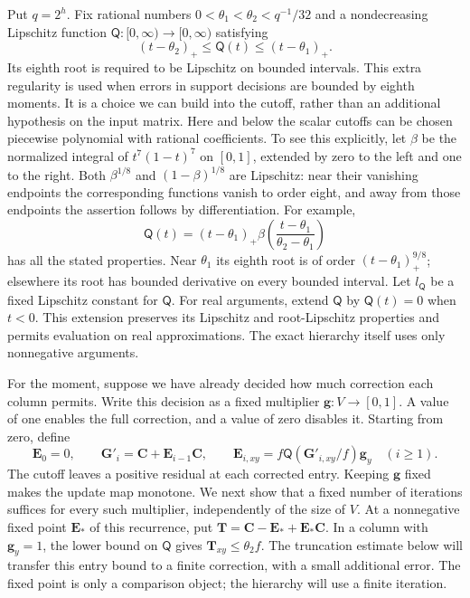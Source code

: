 \documentclass[11pt]{article}
\numberwithin{equation}{section}
\theoremstyle{definition}
\theoremstyle{remark}
\begin{document}
Put $q=2^{h}$.  Fix rational numbers
$0<\theta_1<\theta_2<q^{-1}/32$ and a nondecreasing Lipschitz function
${\mathsf{Q}}:[0,\infty)\to[0,\infty)$ satisfying
\begin{equation}
 (t-\theta_2)_+\leq {\mathsf{Q}}(t)\leq(t-\theta_1)_+.
 \label{eq:hier-Q}
\end{equation}
Its eighth root is required to be Lipschitz on bounded intervals. This extra regularity is used when errors in support decisions are bounded by eighth moments. It is a choice we can build into the cutoff, rather than an additional hypothesis on the input matrix.
Here and below the scalar cutoffs can be chosen piecewise polynomial with
rational coefficients.  To see this explicitly, let $\beta$ be the
normalized integral of $t^7(1-t)^7$ on $[0,1]$, extended by zero to the
left and one to the right.  Both $\beta^{1/8}$ and
$(1-\beta)^{1/8}$ are Lipschitz: near their vanishing endpoints the
corresponding functions vanish to order eight, and away from those
endpoints the assertion follows by differentiation.  For example,
\[
 {\mathsf{Q}}(t)=(t-\theta_1)_+
       \beta\left(\frac{t-\theta_1}{\theta_2-\theta_1}\right)
\]
has all the stated properties.  Near $\theta_1$ its eighth root is of
order $(t-\theta_1)_+^{9/8}$; elsewhere its root has bounded derivative
on every bounded interval.  Let ${l}_{\mathsf{Q}}$ be a fixed Lipschitz constant for
${\mathsf{Q}}$.  For real arguments, extend ${\mathsf{Q}}$ by ${\mathsf{Q}}(t)=0$ when $t<0$.
This extension preserves its Lipschitz and root-Lipschitz properties and
permits evaluation on real approximations.  The exact hierarchy itself
uses only nonnegative arguments.

For the moment, suppose we have already decided how much correction each column permits. Write this decision as a fixed multiplier ${\mathbf{g}}:V\to[0,1]$. A value of one enables the full correction, and a value of zero disables it. Starting from zero, define
\begin{equation}
 {\mathbf{E}}_0=0,\qquad {\mathbf{G}}'_i={\mathbf{C}}+{\mathbf{E}}_{i-1}{\mathbf{C}},\qquad
 {\mathbf{E}}_{i,xy}=f{\mathsf{Q}}({\mathbf{G}}'_{i,xy}/f){\mathbf{g}}_{y}\quad(i\ge1).
 \label{eq:hier-fixed-g-iteration}
\end{equation}
The cutoff leaves a positive residual at each corrected entry.  Keeping
${\mathbf{g}}$ fixed makes the update map monotone.  We next show that a fixed
number of iterations suffices for every such multiplier, independently
of the size of $V$.  At a nonnegative fixed point ${\mathbf{E}}_*$ of this recurrence, put
${\mathbf{T}}={\mathbf{C}}-{\mathbf{E}}_*+{\mathbf{E}}_*{\mathbf{C}}$.  In a column with ${\mathbf{g}}_{y}=1$, the lower bound on ${\mathsf{Q}}$
gives ${\mathbf{T}}_{xy}\le\theta_2f$.  The truncation estimate below will transfer
this entry bound to a finite correction, with a small additional error.
The fixed point is only a comparison object; the hierarchy will use a
finite iteration.
\end{document}
